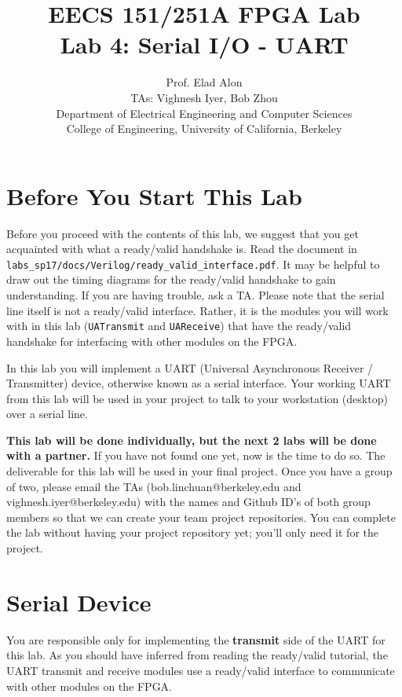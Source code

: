 \documentclass[11pt]{article}
\begin{document}
\title{EECS 151/251A FPGA Lab\\
Lab 4: Serial I/O - UART}

\author{Prof. Elad Alon \\
TAs: Vighnesh Iyer, Bob Zhou \\
Department of Electrical Engineering and Computer Sciences\\
College of Engineering, University of California, Berkeley}
\date{}
\maketitle

\tableofcontents

\section{Before You Start This Lab}

Before you proceed with the contents of this lab, we suggest that you get acquainted with what a ready/valid handshake is. Read the document in \verb|labs_sp17/docs/Verilog/ready_valid_interface.pdf|. It may be helpful to draw out the timing diagrams for the ready/valid handshake to gain understanding. If you are having trouble, ask a TA. Please note that the serial line itself is not a ready/valid interface. Rather, it is the modules you will work with in this lab (\verb|UATransmit| and \verb|UAReceive|) that have the ready/valid handshake for interfacing with other modules on the FPGA.

In this lab you will implement a UART (Universal Asynchronous Receiver / Transmitter) device, otherwise known as a serial interface. Your working UART from this lab will be used in your project to talk to your workstation (desktop) over a serial line.

\textbf{This lab will be done individually, but the next 2 labs will be done with a partner.} If you have not found one yet, now is the time to do so. The deliverable for this lab will be used in your final project. Once you have a group of two, please email the TAs (bob.linchuan@berkeley.edu and vighnesh.iyer@berkeley.edu) with the names and Github ID's of both group members so that we can create your team project repositories. You can complete the lab without having your project repository yet; you'll only need it for the project.

\section{Serial Device}
You are responsible only for implementing the \textbf{transmit} side of the UART for this lab. As you should have inferred from reading the ready/valid tutorial, the UART transmit and receive modules use a ready/valid interface to communicate with other modules on the FPGA.
\end{document}
